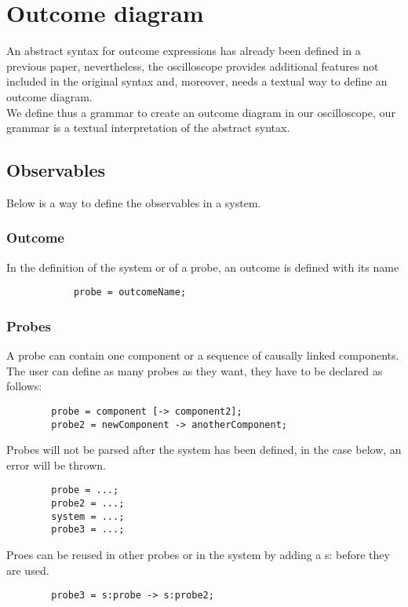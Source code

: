   \section{Outcome diagram}
        An abstract syntax for outcome expressions has already been defined in a previous paper, nevertheless, the oscilloscope provides additional features not included in the original syntax and, moreover, needs a textual way to define an outcome diagram.  \\
        We define thus a grammar to create an outcome diagram in our oscilloscope, our grammar is a textual interpretation of the abstract syntax. \\
        \subsection{Observables}
            Below is a way to define the observables in a system.
            \subsubsection{Outcome}
                In the definition of the system or of a probe, an outcome is defined with its name
        \begin{verbatim}
            probe = outcomeName;
        \end{verbatim}
            \subsubsection{Probes}
                
        A probe can contain one component or a sequence of causally linked components. \\
        The user can define as many probes as they want, they have to be declared as follows:
   \begin{verbatim}
        probe = component [-> component2];
        probe2 = newComponent -> anotherComponent;
   \end{verbatim}

    Probes will not be parsed after the system has been defined, in the case below, an error will be thrown.
    \begin{verbatim}
        probe = ...;
        probe2 = ...;
        system = ...;
        probe3 = ...;
    \end{verbatim}
    
    Proes can be reused in other probes or in the system by adding a s: before they are used.
    \begin{verbatim}
        probe3 = s:probe -> s:probe2;
    \end{verbatim}
 
